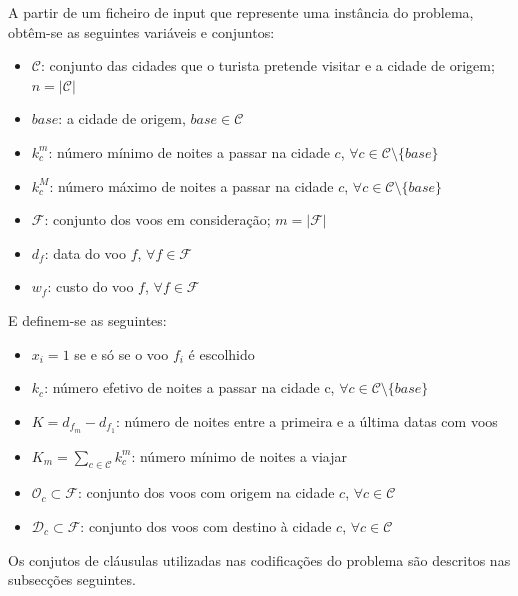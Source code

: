 \documentclass[12pt,a4paper]{article}
\begin{document}
        A partir de um ficheiro de input que represente uma instância do problema, obtêm-se as seguintes variáveis e conjuntos:
        \begin{itemize}
            \item $\mathcal{C}$: conjunto das cidades que o turista pretende visitar e a cidade de origem; $n = \lvert \mathcal{C} \rvert$
            \item $base$: a cidade de origem, $base \in \mathcal{C}$
            \item $k_c^m$: número mínimo de noites a passar na cidade $c$,
                  $\forall c \in \mathcal{C} \setminus \{base\}$
            \item $k_c^M$: número máximo de noites a passar na cidade $c$,
                  $\forall c \in \mathcal{C} \setminus \{base\}$
            \item $\mathcal{F}$: conjunto dos voos em consideração; $m = \lvert \mathcal{F} \rvert$
            \item $d_f$: data do voo $f$, $\forall f \in \mathcal{F}$
            \item $w_f$: custo do voo $f$, $\forall f \in \mathcal{F}$
        \end{itemize}
        E definem-se as seguintes:
        \begin{itemize}
            \item $x_i = 1$ se e só se o voo $f_i$ é escolhido
            \item $k_c$: número efetivo de noites a passar na cidade c,
                  $\forall c \in \mathcal{C} \setminus \{base\}$
            \item $K = d_{f_m} - d_{f_1}$: número de noites entre a primeira e a última datas com voos
            \item $K_m = \sum_{c \in \mathcal{C}}{k_c^m}$: número mínimo de noites a viajar
            \item $\mathcal{O}_c \subset \mathcal{F}$: conjunto dos voos com origem na cidade $c$, $\forall c \in \mathcal{C}$
            \item $\mathcal{D}_c \subset \mathcal{F}$: conjunto dos voos com destino à cidade $c$, $\forall c \in \mathcal{C}$
        \end{itemize}
        Os conjutos de cláusulas utilizadas nas codificações do problema são descritos nas subsecções seguintes.
\end{document}
